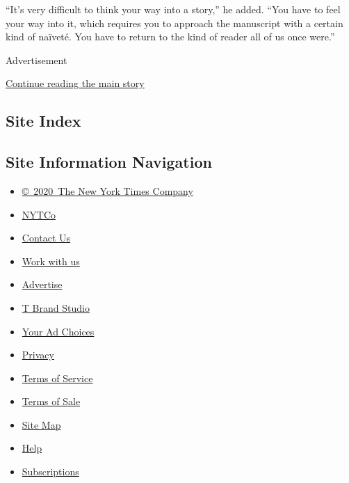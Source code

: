 ``It's very difficult to think your way into a story,'' he added. ``You
have to feel your way into it, which requires you to approach the
manuscript with a certain kind of naïveté. You have to return to the
kind of reader all of us once were.''

Advertisement

\protect\hyperlink{after-bottom}{Continue reading the main story}

\hypertarget{site-index}{%
\subsection{Site Index}\label{site-index}}

\hypertarget{site-information-navigation}{%
\subsection{Site Information
Navigation}\label{site-information-navigation}}

\begin{itemize}
\tightlist
\item
  \href{https://help.nytimes3xbfgragh.onion/hc/en-us/articles/115014792127-Copyright-notice}{©~2020~The
  New York Times Company}
\end{itemize}

\begin{itemize}
\tightlist
\item
  \href{https://www.nytco.com/}{NYTCo}
\item
  \href{https://help.nytimes3xbfgragh.onion/hc/en-us/articles/115015385887-Contact-Us}{Contact
  Us}
\item
  \href{https://www.nytco.com/careers/}{Work with us}
\item
  \href{https://nytmediakit.com/}{Advertise}
\item
  \href{http://www.tbrandstudio.com/}{T Brand Studio}
\item
  \href{https://www.nytimes3xbfgragh.onion/privacy/cookie-policy\#how-do-i-manage-trackers}{Your
  Ad Choices}
\item
  \href{https://www.nytimes3xbfgragh.onion/privacy}{Privacy}
\item
  \href{https://help.nytimes3xbfgragh.onion/hc/en-us/articles/115014893428-Terms-of-service}{Terms
  of Service}
\item
  \href{https://help.nytimes3xbfgragh.onion/hc/en-us/articles/115014893968-Terms-of-sale}{Terms
  of Sale}
\item
  \href{https://spiderbites.nytimes3xbfgragh.onion}{Site Map}
\item
  \href{https://help.nytimes3xbfgragh.onion/hc/en-us}{Help}
\item
  \href{https://www.nytimes3xbfgragh.onion/subscription?campaignId=37WXW}{Subscriptions}
\end{itemize}
